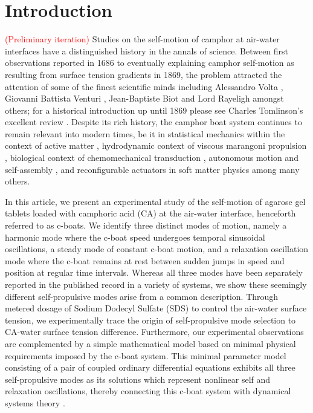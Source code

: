 \documentclass[journal=langd5, manuscript=article, layout=twocolumn]{achemso}
\begin{document}

\section{Introduction}
\label{introsec}
\textcolor{red}{(Preliminary iteration)} Studies on the self-motion of camphor at air-water interfaces have a distinguished history in the annals of science. Between first observations reported in 1686 \cite{Heyde1686} to eventually explaining camphor self-motion as resulting from surface tension gradients in 1869\cite{Mensbrugghe1869}, the problem attracted the attention of some of the finest scientific minds including Alessandro Volta \cite{Volta1787}, Giovanni Battista Venturi \cite{Venturi1797}, Jean-Baptiste Biot \cite{Biot1801} and Lord Rayeligh \cite{Rayleigh1889} amongst others; for a historical introduction up until 1869 please see Charles Tomlinson's excellent review \cite{Tomlinson1869}. Despite its rich history, the camphor boat system continues to remain relevant into modern times, be it in statistical mechanics within the context of active matter \cite{Ramaswamy2010}, hydrodynamic context of viscous marangoni propulsion \cite{Lauga2012}, biological context of chemomechanical transduction \cite{Nakata1997}, autonomous motion and self-assembly \cite{Ismagilov2002}, and reconfigurable actuators in soft matter physics \cite{Geryak2014} among many others.

In this article, we present an experimental study of the self-motion of agarose gel tablets loaded with camphoric acid (CA) at the air-water interface, henceforth referred to as c-boats. We identify three distinct modes of motion, namely a harmonic mode where the c-boat speed undergoes temporal sinusoidal oscillations, a steady mode of constant c-boat motion, and a relaxation oscillation mode where the c-boat remains at rest between sudden jumps in speed and position at regular time intervals. Whereas all three modes have been separately reported in the published record in a variety of systems, we show these seemingly different self-propulsive modes arise from a common description. Through metered dosage of Sodium Dodecyl Sulfate (SDS) to control the air-water surface tension, we experimentally trace the origin of self-propulsive mode selection to CA-water surface tension difference. Furthermore, our experimental observations are complemented by a simple mathematical model based on minimal physical requirements imposed by the c-boat system. This minimal parameter model consisting of a pair of coupled ordinary differential equations exhibits all three self-propulsive modes as its solutions which represent nonlinear self and relaxation oscillations\cite{Jenkins2013}, thereby connecting this c-boat system with dynamical systems theory \cite{Strogatz2001}.
\end{document}
